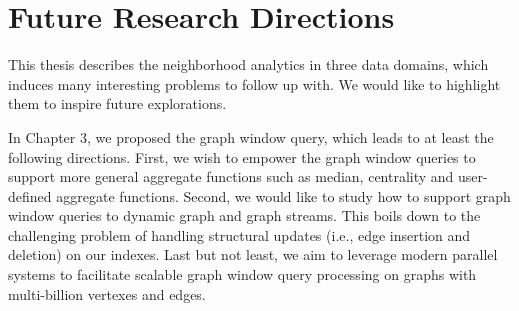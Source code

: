 \section{Future Research Directions}
This thesis describes the neighborhood analytics in three data
domains, which induces many interesting problems to follow up with. We would
like to highlight them to inspire future explorations.

In Chapter 3, we proposed the graph window query, 
which leads to at least the following directions.
First, we wish to empower the graph window queries
to support more general aggregate functions such as median,
centrality and user-defined aggregate functions.
Second, we would like to study how to support graph window
queries to dynamic graph and graph streams. This boils down
to the challenging problem of handling structural updates (i.e., edge insertion and deletion)
on our indexes. Last but not least, we aim to leverage
modern parallel systems to facilitate scalable graph window query
processing on graphs with multi-billion vertexes and edges.





